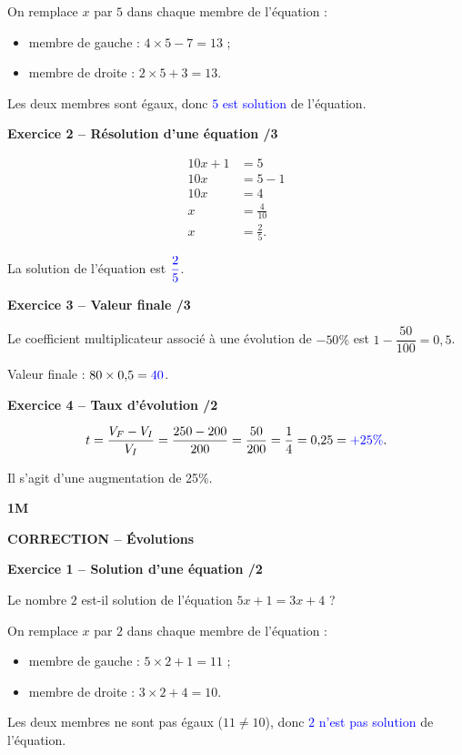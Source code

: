 \documentclass[10pt,a4paper]{article}
\renewcommand{\niveau}{1M}
\renewcommand{\chapitre}{Évolutions}
\renewcommand{\interroversion}[1]{
    \noindent\textbf{\niveau}

    \vspace{-0.5cm}
    \begin{center}
        \textbf{\large CORRECTION -- \chapitre}
    \end{center}

    \vspace{0.1cm}
}
\begin{document}
On remplace \(x\) par \(5\) dans chaque membre de l'équation :
\begin{itemize}
\item membre de gauche : \(4\times5-7=13\) ;
\item membre de droite : \(2\times5+3=13\).
\end{itemize}
Les deux membres sont égaux, donc \textcolor{blue}{\(5\) est solution} de l'équation.

\textbf{Exercice 2 -- Résolution d'une équation \hfill /3}

\[
\begin{aligned}
10x+1&=5\\
10x&=5-1\\
10x&=4\\
x&=\frac{4}{10}\\
x&=\frac{2}{5}.
\end{aligned}
\]

La solution de l'équation est \(\textcolor{blue}{\dfrac{2}{5}}\).

\textbf{Exercice 3 -- Valeur finale \hfill /3}

Le coefficient multiplicateur associé à une évolution de \(-50\%\) est \(1-\dfrac{50}{100}=0{,}5\).

Valeur finale : \(80\times0{,}5=\textcolor{blue}{40}\).


\textbf{Exercice 4 -- Taux d'évolution \hfill /2}

\[
t=\frac{V_F-V_I}{V_I}=\frac{250-200}{200}=\frac{50}{200}=\frac{1}{4}=0{,}25=\textcolor{blue}{+25\%}.
\]

Il s'agit d'une augmentation de 25\%.


\newpage


\interroversion{D}

\textbf{Exercice 1 -- Solution d'une équation \hfill /2}

Le nombre \(2\) est-il solution de l'équation \(5x+1=3x+4\) ?

On remplace \(x\) par \(2\) dans chaque membre de l'équation :
\begin{itemize}
\item membre de gauche : \(5\times2+1=11\) ;
\item membre de droite : \(3\times2+4=10\).
\end{itemize}
Les deux membres ne sont pas égaux (\(11\neq10\)), donc \textcolor{blue}{\(2\) n'est pas solution} de l'équation.
\end{document}
